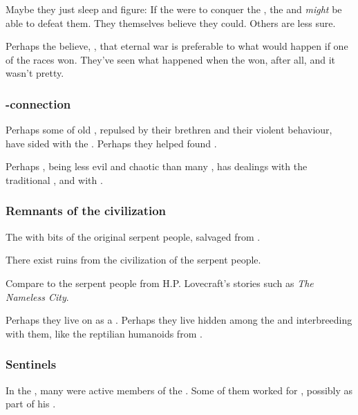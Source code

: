 Maybe they just sleep and figure: 
If the \banes{} were to conquer the \dragons, the \ophidians{} and \nagae{} \emph{might} be able to defeat them. 
They themselves believe they could. 
Others are less sure. 

Perhaps the \ophidians{} believe, , that eternal war is preferable to what would happen if one of the races won. 
They've seen what happened when the \draecchonosh{} won, after all, and it wasn't pretty.





\subsubsection{\Ophidian-\resphan connection}
Perhaps some of old \ophidians, repulsed by their \draconic{} brethren and their violent behaviour, have sided with the \resphain. Perhaps they helped found \Mystraacht. 

Perhaps \Ishnaruchaefir, being less evil and chaotic than many \dragons, has dealings with the traditional \ophidians{}, and with \Mystraacht.  





\subsubsection{Remnants of the \ophidian{} civilization}
The \scathae{}  with bits of the original serpent people, salvaged from . 

There exist ruins from the civilization of the serpent people. 

Compare to the serpent people from H.P. Lovecraft's stories such as \emph{The Nameless City}.

Perhaps they live on as a . Perhaps they live hidden among the \scathae{} and interbreeding with them, like the reptilian humanoids from \DIBiggestSecret. 





\subsubsection{Sentinels}
In the , many \quiljaaran were active members of the . 
Some of them worked for , possibly as part of his . 

